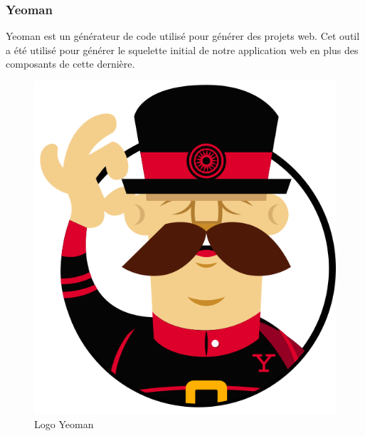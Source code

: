 \subsubsection{Yeoman}
\noindent\begin{minipage}{0.69\textwidth}
Yeoman est un générateur de code utilisé pour générer des projets web. Cet outil a été utilisé pour générer le squelette initial de notre application web en plus des composants de cette dernière.
\end{minipage}
\begin{minipage}{0.3\textwidth}
\begin{figure}[H]
  \centering
  \includegraphics[scale=0.17]{figures/logo/yeoman.png}
  \caption{Logo Yeoman}
  \label{code34}
\end{figure}
\end{minipage}
